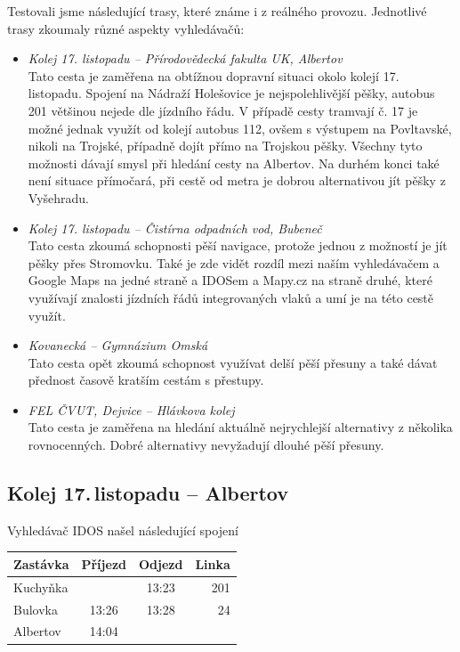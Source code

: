 Testovali jsme následující trasy, které známe i z reálného provozu. Jednotlivé
trasy zkoumaly různé aspekty vyhledávačů:
\begin{itemize}
	\item {\em Kolej 17. listopadu -- Přírodovědecká fakulta UK, Albertov}\\ Tato
	cesta je zaměřena na obtížnou dopravní situaci okolo kolejí 17.
	listopadu. Spojení na Nádraží Holešovice je nejspolehlivější pěšky,
	autobus 201 většinou nejede dle jízdního řádu. V případě cesty tramvají
	č. 17 je možné jednak využít od kolejí autobus 112, ovšem s výstupem na
	Povltavské, nikoli na Trojské, případně dojít přímo na Trojskou pěšky.
	Všechny tyto možnosti dávají smysl při hledání cesty na Albertov. Na
	durhém konci také není situace přímočará, při cestě od metra je dobrou
	alternativou jít pěšky z Vyšehradu. 
	\item {\em Kolej 17. listopadu -- Čistírna odpadních vod, Bubeneč}\\ Tato
	cesta zkoumá schopnosti pěší navigace, protože jednou z možností je jít
	pěšky přes Stromovku. Také je zde vidět rozdíl mezi naším vyhledávačem a
	Google Maps na jedné straně a IDOSem a Mapy.cz na straně druhé, které
	využívají znalosti jízdních řádů integrovaných vlaků a umí je na této
	cestě využít.
	\item {\em Kovanecká -- Gymnázium Omská}\\ Tato cesta opět zkoumá schopnost
	využívat delší pěší přesuny a také dávat přednost časově kratším cestám
	s přestupy. 
	\item {\em FEL ČVUT, Dejvice -- Hlávkova kolej}\\ Tato cesta je zaměřena na
	hledání aktuálně nejrychlejší alternativy z několika rovnocenných. Dobré
	alternativy nevyžadují dlouhé pěší přesuny.
\end{itemize}
\subsection{Kolej 17.\,listopadu -- Albertov}

Vyhledávač IDOS našel následující spojení

\begin{tabular}{|l|c|c|r|}\hline
{\bf Zastávka}&{\bf Příjezd}&{\bf Odjezd}&{\bf Linka}\\\hline
Kuchyňka&&13:23&201\\\hline
Bulovka&13:26&13:28&24\\\hline
Albertov&14:04&&\\\hline
\end{tabular} 

